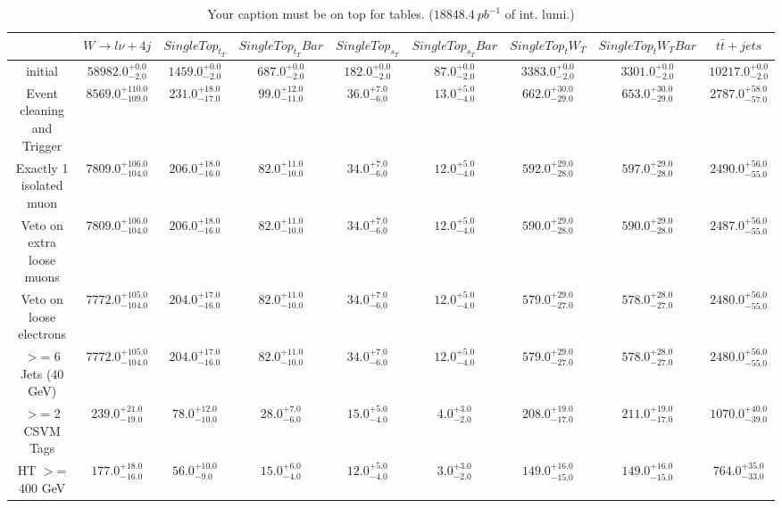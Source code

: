 \documentclass{article}
\begin{document}
\begin{table}
\caption{Your caption must be on top for tables. ($18848.4~pb^{-1}$ of int. lumi.)}
\label{tab:}
\centering
\begin{tabular}{|c|cccccccc|}
\toprule
&$W\rightarrow l\nu + 4j$	&$SingleTop_t_T$	&$SingleTop_t_TBar$	&$SingleTop_s_T$	&$SingleTop_s_TBar$	&$SingleTop_tW_T$	&$SingleTop_tW_TBar$	&$t\bar{t}+jets$	\\

\midrule
initial&	$58982.0^{+0.0}_{-2.0}$	&$1459.0^{+0.0}_{-2.0}$	&$687.0^{+0.0}_{-2.0}$	&$182.0^{+0.0}_{-2.0}$	&$87.0^{+0.0}_{-2.0}$	&$3383.0^{+0.0}_{-2.0}$	&$3301.0^{+0.0}_{-2.0}$	&$10217.0^{+0.0}_{-2.0}$	\\

Event cleaning and Trigger&	$8569.0^{+110.0}_{-109.0}$	&$231.0^{+18.0}_{-17.0}$	&$99.0^{+12.0}_{-11.0}$	&$36.0^{+7.0}_{-6.0}$	&$13.0^{+5.0}_{-4.0}$	&$662.0^{+30.0}_{-29.0}$	&$653.0^{+30.0}_{-29.0}$	&$2787.0^{+58.0}_{-57.0}$	\\

Exactly 1 isolated muon&	$7809.0^{+106.0}_{-104.0}$	&$206.0^{+18.0}_{-16.0}$	&$82.0^{+11.0}_{-10.0}$	&$34.0^{+7.0}_{-6.0}$	&$12.0^{+5.0}_{-4.0}$	&$592.0^{+29.0}_{-28.0}$	&$597.0^{+29.0}_{-28.0}$	&$2490.0^{+56.0}_{-55.0}$	\\

Veto on extra loose muons&	$7809.0^{+106.0}_{-104.0}$	&$206.0^{+18.0}_{-16.0}$	&$82.0^{+11.0}_{-10.0}$	&$34.0^{+7.0}_{-6.0}$	&$12.0^{+5.0}_{-4.0}$	&$590.0^{+29.0}_{-28.0}$	&$590.0^{+29.0}_{-28.0}$	&$2487.0^{+56.0}_{-55.0}$	\\

Veto on loose electrons&	$7772.0^{+105.0}_{-104.0}$	&$204.0^{+17.0}_{-16.0}$	&$82.0^{+11.0}_{-10.0}$	&$34.0^{+7.0}_{-6.0}$	&$12.0^{+5.0}_{-4.0}$	&$579.0^{+29.0}_{-27.0}$	&$578.0^{+28.0}_{-27.0}$	&$2480.0^{+56.0}_{-55.0}$	\\

$>$= 6 Jets (40 GeV)&	$7772.0^{+105.0}_{-104.0}$	&$204.0^{+17.0}_{-16.0}$	&$82.0^{+11.0}_{-10.0}$	&$34.0^{+7.0}_{-6.0}$	&$12.0^{+5.0}_{-4.0}$	&$579.0^{+29.0}_{-27.0}$	&$578.0^{+28.0}_{-27.0}$	&$2480.0^{+56.0}_{-55.0}$	\\

$>$= 2 CSVM Tags&	$239.0^{+21.0}_{-19.0}$	&$78.0^{+12.0}_{-10.0}$	&$28.0^{+7.0}_{-6.0}$	&$15.0^{+5.0}_{-4.0}$	&$4.0^{+3.0}_{-2.0}$	&$208.0^{+19.0}_{-17.0}$	&$211.0^{+19.0}_{-17.0}$	&$1070.0^{+40.0}_{-39.0}$	\\

HT $>$=  400 GeV&	$177.0^{+18.0}_{-16.0}$	&$56.0^{+10.0}_{-9.0}$	&$15.0^{+6.0}_{-4.0}$	&$12.0^{+5.0}_{-4.0}$	&$3.0^{+3.0}_{-2.0}$	&$149.0^{+16.0}_{-15.0}$	&$149.0^{+16.0}_{-15.0}$	&$764.0^{+35.0}_{-33.0}$	\\

\bottomrule
\end{tabular}
\end{table}
\end{document}
